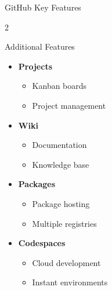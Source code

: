 \documentclass[aspectratio=169]{beamer}
\begin{document}
\begin{frame}{GitHub Key Features}
\begin{multicols}{2}
			\begin{block}{Additional Features}
				\begin{itemize}
					\item \textbf{Projects}
					\begin{itemize}
						\item Kanban boards
						\item Project management
					\end{itemize}
					\item \textbf{Wiki}
					\begin{itemize}
						\item Documentation
						\item Knowledge base
					\end{itemize}
					\item \textbf{Packages}
					\begin{itemize}
						\item Package hosting
						\item Multiple registries
					\end{itemize}
					\item \textbf{Codespaces}
					\begin{itemize}
						\item Cloud development
						\item Instant environments
					\end{itemize}
				\end{itemize}
			\end{block}
		\end{multicols}
	\end{frame}
	
\end{document}
